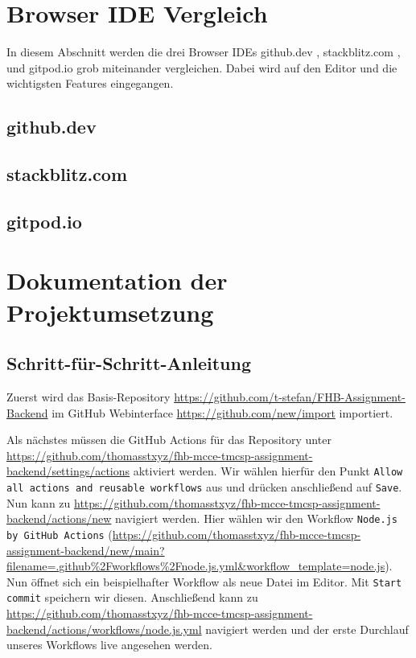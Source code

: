 \section{Browser IDE Vergleich}
In diesem Abschnitt werden die drei Browser IDEs
github.dev \cite{githubDevWebsite},
stackblitz.com \cite{stackblitzcomWebsite},
und
gitpod.io \cite{gitpodioWebsite}
grob miteinander vergleichen.
Dabei wird auf den Editor und die wichtigsten Features eingegangen.

\subsection{github.dev}

\subsection{stackblitz.com}

\subsection{gitpod.io}


\clearpage
\section{Dokumentation der Projektumsetzung}

\subsection{Schritt-für-Schritt-Anleitung}
Zuerst wird das Basis-Repository 
\url{https://github.com/t-stefan/FHB-Assignment-Backend}
im GitHub Webinterface
\url{https://github.com/new/import} 
importiert.


\noindent
Als nächstes müssen die GitHub Actions für das Repository unter
\url{https://github.com/thomasstxyz/fhb-mcce-tmcsp-assignment-backend/settings/actions}
aktiviert werden.
Wir wählen hierfür den Punkt \verb|Allow all actions and reusable workflows| aus
und drücken anschließend auf \verb|Save|. \\

\noindent
Nun kann zu \url{https://github.com/thomasstxyz/fhb-mcce-tmcsp-assignment-backend/actions/new}
navigiert werden.
Hier wählen wir den Workflow \verb|Node.js by GitHub Actions| 
(\url{https://github.com/thomasstxyz/fhb-mcce-tmcsp-assignment-backend/new/main?filename=.github%2Fworkflows%2Fnode.js.yml&workflow_template=node.js}).
Nun öffnet sich ein beispielhafter Workflow als neue Datei im Editor.
Mit \verb|Start commit| speichern wir diesen.
Anschließend kann zu \url{https://github.com/thomasstxyz/fhb-mcce-tmcsp-assignment-backend/actions/workflows/node.js.yml}
navigiert werden und der erste Durchlauf unseres Workflows live angesehen werden. \\

